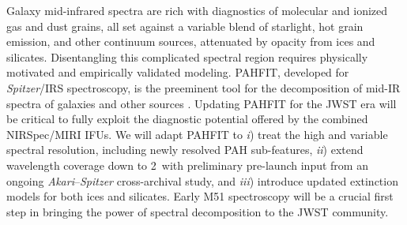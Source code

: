 \documentclass[12pt]{article}
\begin{document}
\vspace{0.05in} 

  Galaxy mid-infrared spectra are rich with diagnostics of molecular and ionized gas and dust grains, all set against a variable blend of starlight, hot grain emission, and other continuum sources, attenuated by opacity from ices and silicates.  Disentangling this complicated spectral region requires physically motivated and empirically validated modeling.  PAHFIT, developed for {\em Spitzer}/IRS spectroscopy, is the preeminent tool for the decomposition of mid-IR spectra of galaxies and other sources \citep{smith2007}.  Updating PAHFIT for the JWST era will be critical to fully exploit the diagnostic potential offered by the combined NIRSpec/MIRI IFUs.  We will adapt PAHFIT to {\em i}) treat the high and variable spectral resolution, including newly resolved PAH sub-features, {\em ii}) extend wavelength coverage down to 2\micron\ with preliminary pre-launch input from an ongoing {\em Akari}--{\em Spitzer} cross-archival study, and {\em iii}) introduce updated extinction models for both ices and silicates.  Early M51 spectroscopy will be a crucial first step in bringing the power of spectral decomposition to the JWST community.



\end{document}
